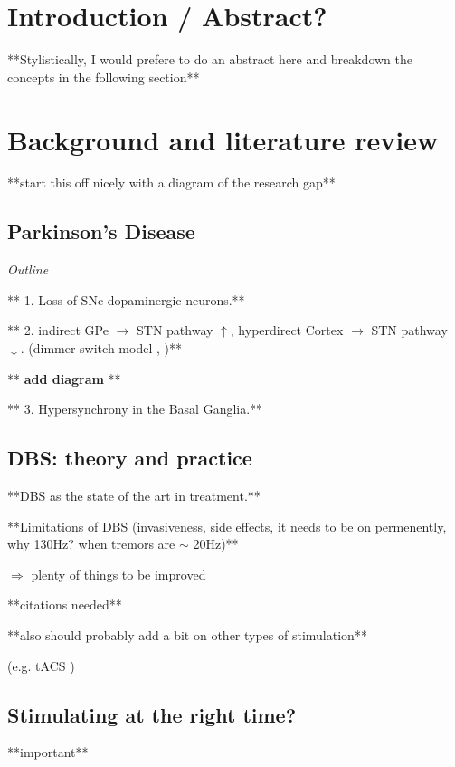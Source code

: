 \tableofcontents
\newpage

\section{Introduction / Abstract?}
**Stylistically, I would prefere to do an abstract here and breakdown the concepts in the following section**
\section{Background and literature review}
**start this off nicely with a diagram of the research gap**

\subsection{Parkinson's Disease}
\textit{Outline} \cite{del2018advances}

** 1. Loss of SNc dopaminergic neurons.**

** 2. indirect GPe $\rightarrow$ STN pathway $\uparrow$,
hyperdirect Cortex $\rightarrow$ STN pathway $\downarrow$.
(dimmer switch model \cite{helmich2012cerebral}, \cite{west2022stimulating})**

** \textbf{add diagram} **

** 3. Hypersynchrony in the Basal Ganglia.**

\subsection{DBS: theory and practice}
**DBS as the state of the art in treatment.**

**Limitations of DBS (invasiveness, side effects, it needs to be on permenently,
why 130Hz? when tremors are $\sim$ 20Hz)**

$\Rightarrow$ plenty of things to be improved

**citations needed**

**also should probably add a bit on other types of stimulation**

(e.g. tACS \cite{saturnino2017target} \cite{schwab2020spike} \cite{schwab2019modulation})


\subsection{Stimulating at the right time?}
**important** \cite{cagnan2017stimulating} \cite{beudel2018adaptive} \cite{west2022stimulating}

